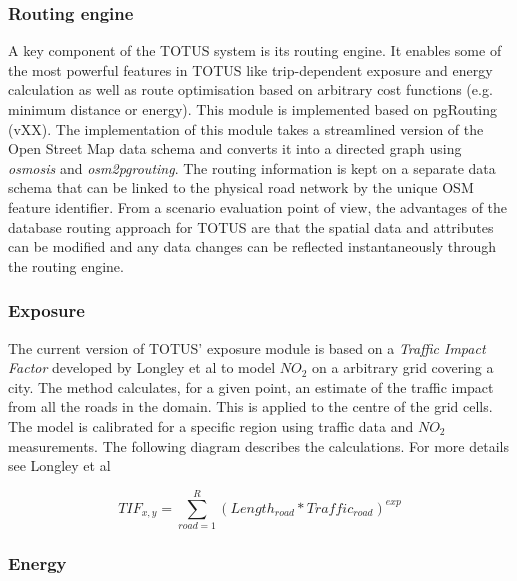 
\subsubsection*{Routing engine}
A key component of the TOTUS system is its routing engine. It enables some of the most powerful features in TOTUS like trip-dependent exposure and energy calculation as well as route optimisation based on arbitrary cost functions (e.g. minimum distance or energy). This module is implemented based on pgRouting (vXX)\cite{dummy_temp}. The implementation of this module takes a streamlined version of the Open Street Map \cite{dummy_temp} data schema and converts it into a directed graph using \textit{osmosis}\cite{dummy_temp} and \textit{osm2pgrouting}\cite{dummy_temp}. The routing information is kept on a separate data schema that can be linked to the physical road network by the unique OSM feature identifier. From a scenario evaluation point of view, the advantages of the database routing approach for TOTUS are that the spatial data and attributes can be modified and any data changes can be reflected instantaneously through the routing engine. 

\subsubsection*{Exposure}
The current version of TOTUS' exposure module is based on a \textit{Traffic Impact Factor} developed by Longley et al\cite{dummy_temp} to model $NO_2$ on a arbitrary grid covering a city. The method calculates, for a given point, an estimate of the traffic impact from all the roads in the domain. This is applied to the centre of the grid cells. The model is calibrated for a specific region using traffic data and $NO_2$ measurements. The following diagram describes the calculations. For more details see Longley et al\cite{dummy_temp}

\begin{equation}
\label{eq:tif}
TIF_{x,y} = \sum_{road=1}^{R}{(Length_{road}*Traffic_{road})^{exp}}
\end{equation}

\subsubsection*{Energy}

